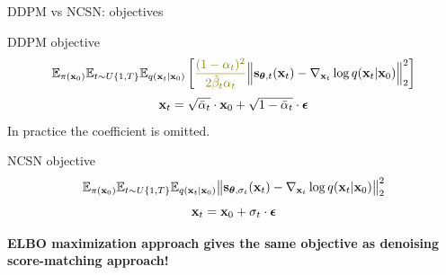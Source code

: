 \begin{frame}{DDPM vs NCSN: objectives}
	\begin{block}{DDPM objective}
		\vspace{-0.5cm}
		\[
			\bbE_{\pi(\bx_0)} \bbE_{t \sim U\{1, T\}}\bbE_{q(\bx_t | \bx_0)} \left[ {\color{olive}\frac{(1 - \alpha_t)^2}{2\tilde{\beta}_t \alpha_t}} \Bigl\|  \bs_{\btheta, t} (\bx_t) - \nabla_{\bx_t} \log q(\bx_t | \bx_0) \Bigr\|_2^2  \right]
		\]
		\[
			\mathbf{x}_t = \sqrt{\bar{\alpha}_t} \cdot \mathbf{x}_0 + \sqrt{1 - \bar{\alpha}_t} \cdot \boldsymbol{\epsilon}
		\]
		In practice {\color{olive}the coefficient} is omitted.
	\end{block}
	\begin{block}{NCSN objective}
		\vspace{-0.3cm}
		\[
			\mathbb{E}_{\pi(\mathbf{x}_0)} \mathbb{E}_{t \sim U\{1, T\}} \mathbb{E}_{q(\mathbf{x}_t | \mathbf{x}_0)}\bigl\| \mathbf{s}_{\boldsymbol{\theta}, \sigma_t}(\mathbf{x}_t) - \nabla_{\mathbf{x}_t} \log q(\mathbf{x}_t | \mathbf{x}_0) \bigr\|^2_2 
		\]
		\[
			\mathbf{x}_t = \mathbf{x}_0 + \sigma_t \cdot \boldsymbol{\epsilon}
		\]
		\vspace{-0.5cm}
	\end{block}
	\textbf{ELBO maximization approach gives the same objective as denoising score-matching approach!}
	\end{frame}
